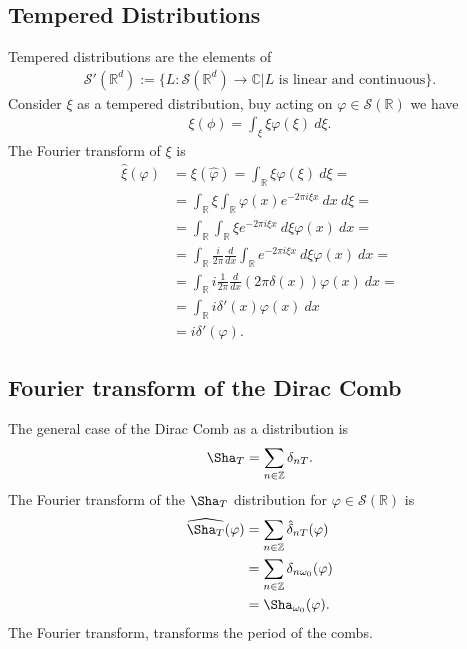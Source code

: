 \documentclass[a4paper]{article}
\begin{document}
\subsection{Tempered Distributions}
Tempered distributions are the elements of
\begin{align}
    \mathcal{S}'(\mathbb{R}^d) :=
    \bigg\{
        L: \mathcal{S}(\mathbb{R}^d) \rightarrow \mathbb{C} | \text{$L$ is
        linear and continuous}
    \bigg\}.
\end{align}
Consider $\xi$ as a tempered distribution, buy acting on $\varphi \in
\mathcal{S}(\mathbb{R})$ we have
\begin{align}
    \xi(\phi) = \int_\xi \xi \varphi(\xi)\ d\xi.
\end{align}
The Fourier transform of $\xi$ is
\begin{align}
    \hat{\xi}(\varphi)
    &=\xi(\hat{\varphi})
    = \int_\mathbb{R} \xi \hat{\varphi}(\xi)\ d\xi=\\
    &= \int_\mathbb{R}\xi \int_\mathbb{R} \varphi(x) e^{-2\pi i \xi x}\ dx\
    d\xi=\\
    &=\int_\mathbb{R}\int_\mathbb{R} \xi e^{-2\pi i \xi x}\ d\xi \varphi(x)\
    dx=\\
    &=\int_\mathbb{R} \frac{i}{2\pi}\frac{d}{dx}\int_\mathbb{R}e^{-2\pi i \xi
x} \ d\xi \varphi(x)\ dx=\\
    &= \int_\mathbb{R}i\frac{1}{2\pi} \frac{d}{dx}\left(2\pi \delta(x)\right)
    \varphi(x)\ dx=\\
    &= \int_\mathbb{R} i\delta'(x)\varphi(x)\ dx\\
    &= i \delta'(\varphi).
\end{align}
\subsection{Fourier transform of the Dirac Comb}
The general case of the Dirac Comb as a distribution is
\begin{align}
    \Sha_T = \sum_{n \in \mathbb{Z}} \delta_{nT}.
\end{align}
The Fourier transform of the $\Sha_T$ distribution for $\varphi \in
\mathcal{S}(\mathbb{R})$ is
\begin{align}
    \widehat{\Sha_T}(\varphi)
    &= \sum_{n\in\mathbb{Z}} \hat{\delta}_{nT}(\varphi)\\
    &= \sum_{n\in\mathbb{Z}} \delta_{n\omega_0}(\varphi)\\
    &=\Sha_{\omega_0}(\varphi).
\end{align}
The Fourier transform, transforms the period of the combs.
\end{document}
